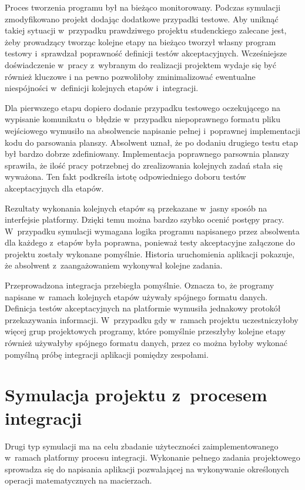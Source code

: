 Proces tworzenia programu był na bieżąco monitorowany.
Podczas symulacji zmodyfikowano projekt dodając dodatkowe przypadki testowe.
Aby uniknąć takiej sytuacji w~przypadku prawdziwego projektu studenckiego zalecane jest, żeby prowadzący tworząc kolejne etapy na bieżąco tworzył własny program testowy i~sprawdzał poprawność definicji testów akceptacyjnych.
Wcześniejsze doświadczenie w~pracy z~wybranym do realizacji projektem wydaje się być również kluczowe i na pewno pozwoliłoby zminimalizować ewentualne niespójności w~definicji kolejnych etapów i~integracji.

Dla pierwszego etapu dopiero dodanie przypadku testowego oczekującego na wypisanie komunikatu o~błędzie w~przypadku niepoprawnego formatu pliku wejściowego wymusiło na absolwencie napisanie pełnej i~poprawnej implementacji kodu do parsowania planszy.
Absolwent uznał, że po dodaniu drugiego testu etap był bardzo dobrze zdefiniowany.
Implementacja poprawnego parsownia planszy sprawiła, że ilość pracy potrzebnej do zrealizowania kolejnych zadań stała się wyważona.
Ten fakt podkreśla istotę odpowiedniego doboru testów akceptacyjnych dla etapów.

Rezultaty wykonania kolejnych etapów są przekazane w~jasny sposób na interfejsie platformy.
Dzięki temu można bardzo szybko ocenić postępy pracy.
W~przypadku symulacji wymagana logika programu napisanego przez absolwenta dla każdego z~etapów była poprawna, ponieważ testy akceptacyjne załączone do projektu zostały wykonane pomyślnie.
Historia uruchomienia aplikacji pokazuje, że absolwent z~zaangażowaniem wykonywał kolejne zadania.

Przeprowadzona integracja przebiegła pomyślnie.
Oznacza to, że programy napisane w~ramach kolejnych etapów używały spójnego formatu danych.
Definicja testów akceptacyjnych na platformie wymusiła jednakowy protokół przekazywania informacji.
W~przypadku gdy w~ramach projektu uczestniczyłoby więcej grup projektowych programy, które pomyślnie przeszłyby kolejne etapy również używałyby spójnego formatu danych, przez co można byłoby wykonać pomyślną próbę integracji aplikacji pomiędzy zespołami.

\section{Symulacja projektu z~procesem integracji}
\label{research_matrix}

Drugi typ symulacji ma na celu zbadanie użyteczności zaimplementowanego w~ramach platformy procesu integracji.
Wykonanie pełnego zadania projektowego sprowadza się do napisania aplikacji pozwalającej na wykonywanie określonych operacji matematycznych na macierzach.

